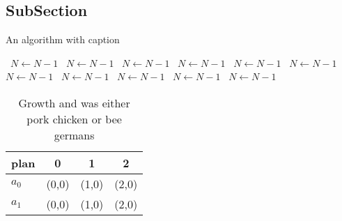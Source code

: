 \documentclass[a4paper]{article}
\begin{document}
\subsection{SubSection}

\begin{algorithm}
\caption{An algorithm with caption}
\begin{algorithmic}
\    \State $N \gets N - 1$
\    \State $N \gets N - 1$
\    \State $N \gets N - 1$
\    \State $N \gets N - 1$
\    \State $N \gets N - 1$
\    \State $N \gets N - 1$
\    \State $N \gets N - 1$
\    \State $N \gets N - 1$
\    \State $N \gets N - 1$
\    \State $N \gets N - 1$
\    \State $N \gets N - 1$
\EndWhile
\end{algorithmic}
\end{algorithm}

\begin{table}
\begin{adjustbox}{width=0.6\columnwidth}
\begin{tabular}{|l|l|l|l|}
\hline
\textbf{plan} & \multicolumn{1}{c|}{\textbf{0}} & \multicolumn{1}{c|}{\textbf{1}} & \multicolumn{1}{c|}{\textbf{2}} \\ \hline
\textbf{$a_0$}  & (0,0) & (1,0) & (2,0) \\ \hline
\textbf{$a_1$}  & (0,0) & (1,0) & (2,0) \\ \hline
\end{tabular}
\end{adjustbox}
\caption{Growth and was either pork chicken or bee germans
}
\end{table}
\end{document}
